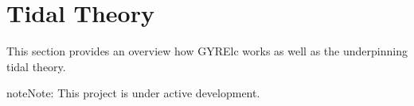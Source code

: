 \documentclass[letterpaper,10pt,english]{sphinxmanual}
\begin{document}
\chapter{Tidal Theory}
\label{\detokenize{ref-guide/tidal-theory:tidal-theory}}\label{\detokenize{ref-guide/tidal-theory::doc}}
\sphinxAtStartPar
This section provides an overview how GYRE\sphinxhyphen{}lc works as well as the underpinning tidal theory.

\begin{sphinxadmonition}{note}{Note:}
\sphinxAtStartPar
This project is under active development.
\end{sphinxadmonition}



\renewcommand{\indexname}{Index}
\printindex
\end{document}
